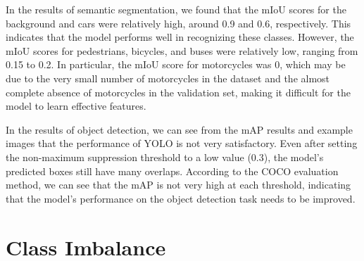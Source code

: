 \documentclass[conference]{IEEEtran}
\begin{document}
In the results of semantic segmentation, we found that the mIoU scores for the background and cars were relatively high, around 0.9 and 0.6, respectively. This indicates that the model performs well in recognizing these classes. However, the mIoU scores for pedestrians, bicycles, and buses were relatively low, ranging from 0.15 to 0.2. In particular, the mIoU score for motorcycles was 0, which may be due to the very small number of motorcycles in the dataset and the almost complete absence of motorcycles in the validation set, making it difficult for the model to learn effective features.


In the results of object detection, we can see from the mAP results and example images that the performance of YOLO is not very satisfactory. Even after setting the non-maximum suppression threshold to a low value (0.3), the model's predicted boxes still have many overlaps. According to the COCO evaluation method, we can see that the mAP is not very high at each threshold, indicating that the model's performance on the object detection task needs to be improved.







\section{Class Imbalance}

\end{document}
